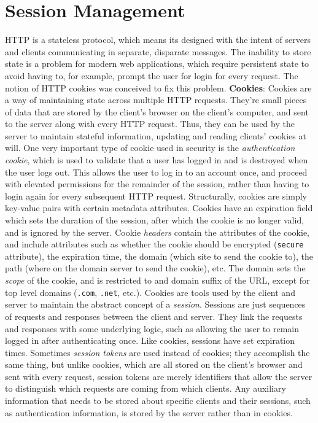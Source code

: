 \documentclass{article}
\begin{document}
\section{Session Management}
HTTP is a stateless protocol, which means its designed with the intent of servers and clients communicating in separate, disparate messages. The inability to store state is a problem for modern web applications, which require persistent state to avoid having to, for example, prompt the user for login for every request. The notion of HTTP cookies was conceived to fix this problem.
\newline \newline
\textbf{Cookies}: Cookies are a way of maintaining state across multiple HTTP requests. They're small pieces of data that are stored by the client's browser on the client's computer, and sent to the server along with every HTTP request. Thus, they can be used by the server to maintain stateful information, updating and reading clients' cookies at will. One very important type of cookie used in security is the \textit{authentication cookie}, which is used to validate that a user has logged in and is destroyed when the user logs out. This allows the user to log in to an account once, and proceed with elevated permissions for the remainder of the session, rather than having to login again for every subsequent HTTP request. Structurally, cookies are simply key-value pairs with certain metadata attributes. Cookies have an expiration field which sets the duration of the session, after which the cookie is no longer valid, and is ignored by the server.
\newline
\indent Cookie \textit{headers} contain the attributes of the cookie, and include attributes such as whether the cookie should be encrypted (\texttt{secure} attribute), the expiration time, the domain (which site to send the cookie to), the path (where on the domain server to send the cookie), etc. The domain sets the \textit{scope} of the cookie, and is restricted to and domain suffix of the URL, except for top level domains (\texttt{.com}, \texttt{.net}, etc.).
\newline \newline
Cookies are tools used by the client and server to maintain the abstract concept of a \textit{session}. Sessions are just sequences of requests and responses between the client and server. They link the requests and responses with some underlying logic, such as allowing the user to remain logged in after authenticating once. Like cookies, sessions have set expiration times. Sometimes \textit{session tokens} are used instead of cookies; they accomplish the same thing, but unlike cookies, which are all stored on the client's browser and sent with every request, session tokens are merely identifiers that allow the server to distinguish which requests are coming from which clients. Any auxiliary information that needs to be stored about specific clients and their sessions, such as authentication information, is stored by the server rather than in cookies.
\end{document}
